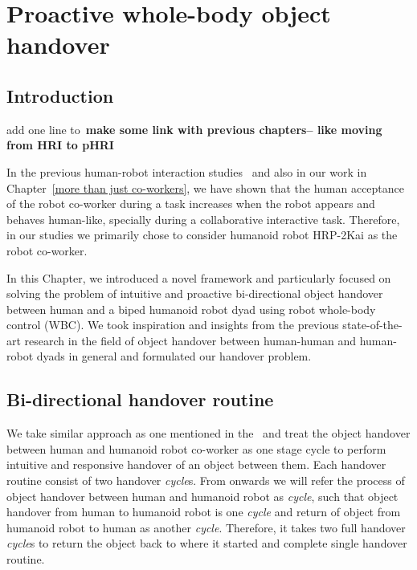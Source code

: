 	
{\color{blue}\chapter{Proactive whole-body object handover}\label{handover chapter}}


\section{Introduction}\label{introduction}

add one line to~\textbf{make some link with previous chapters-- like moving from HRI to pHRI\\}

In the previous human-robot interaction studies~\cite{huber2008human, strabala2013toward, shibata1995experimental} and also in our work in Chapter~\ref{more than just co-workers}, we have shown that the human acceptance of the robot co-worker during a task increases when the robot appears and behaves human-like, specially during a collaborative interactive task. Therefore, in our studies we primarily chose to consider humanoid robot HRP-2Kai as the robot co-worker. 

In this Chapter,  we introduced a novel framework and particularly focused on solving the problem of intuitive and proactive bi-directional object handover between human and a biped humanoid robot dyad using robot whole-body control (WBC). We took inspiration and insights from the previous state-of-the-art research in the field of object handover between human-human and human-robot dyads in general and formulated our handover problem.


\section{Bi-directional handover routine}\label{handover routine}

We take similar approach as one mentioned in the~\cite{medina2016human, nemlekarprompt} and treat the object handover between human and humanoid robot co-worker as one stage cycle to perform intuitive and responsive handover of an object between them. Each handover routine consist of two handover \textit{cycle}s. From onwards we will refer the process of object handover between human and humanoid robot as \textit{cycle}, such that object handover from human to humanoid robot is one \textit{cycle} and return of object from humanoid robot to human as another \textit {cycle}. Therefore, it takes two full handover \textit{cycle}s to return the object back to where it started and complete single handover routine.

